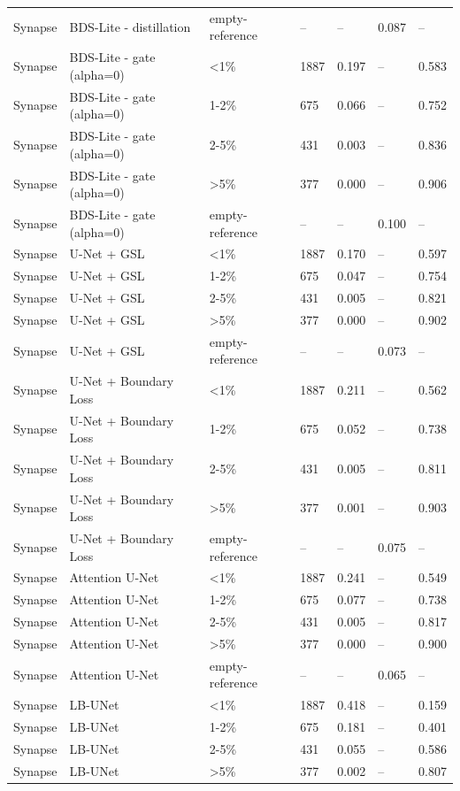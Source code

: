 \begin{longtable}{lllllll}
Synapse & BDS-Lite - distillation & empty-reference & -- & -- & 0.087 & -- \\
Synapse & BDS-Lite - gate (alpha=0) & <1\% & 1887 & 0.197 & -- & 0.583 \\
Synapse & BDS-Lite - gate (alpha=0) & 1-2\% & 675 & 0.066 & -- & 0.752 \\
Synapse & BDS-Lite - gate (alpha=0) & 2-5\% & 431 & 0.003 & -- & 0.836 \\
Synapse & BDS-Lite - gate (alpha=0) & >5\% & 377 & 0.000 & -- & 0.906 \\
Synapse & BDS-Lite - gate (alpha=0) & empty-reference & -- & -- & 0.100 & -- \\
Synapse & U-Net + GSL & <1\% & 1887 & 0.170 & -- & 0.597 \\
Synapse & U-Net + GSL & 1-2\% & 675 & 0.047 & -- & 0.754 \\
Synapse & U-Net + GSL & 2-5\% & 431 & 0.005 & -- & 0.821 \\
Synapse & U-Net + GSL & >5\% & 377 & 0.000 & -- & 0.902 \\
Synapse & U-Net + GSL & empty-reference & -- & -- & 0.073 & -- \\
Synapse & U-Net + Boundary Loss & <1\% & 1887 & 0.211 & -- & 0.562 \\
Synapse & U-Net + Boundary Loss & 1-2\% & 675 & 0.052 & -- & 0.738 \\
Synapse & U-Net + Boundary Loss & 2-5\% & 431 & 0.005 & -- & 0.811 \\
Synapse & U-Net + Boundary Loss & >5\% & 377 & 0.001 & -- & 0.903 \\
Synapse & U-Net + Boundary Loss & empty-reference & -- & -- & 0.075 & -- \\
Synapse & Attention U-Net & <1\% & 1887 & 0.241 & -- & 0.549 \\
Synapse & Attention U-Net & 1-2\% & 675 & 0.077 & -- & 0.738 \\
Synapse & Attention U-Net & 2-5\% & 431 & 0.005 & -- & 0.817 \\
Synapse & Attention U-Net & >5\% & 377 & 0.000 & -- & 0.900 \\
Synapse & Attention U-Net & empty-reference & -- & -- & 0.065 & -- \\
Synapse & LB-UNet & <1\% & 1887 & 0.418 & -- & 0.159 \\
Synapse & LB-UNet & 1-2\% & 675 & 0.181 & -- & 0.401 \\
Synapse & LB-UNet & 2-5\% & 431 & 0.055 & -- & 0.586 \\
Synapse & LB-UNet & >5\% & 377 & 0.002 & -- & 0.807 \\

\end{longtable}

